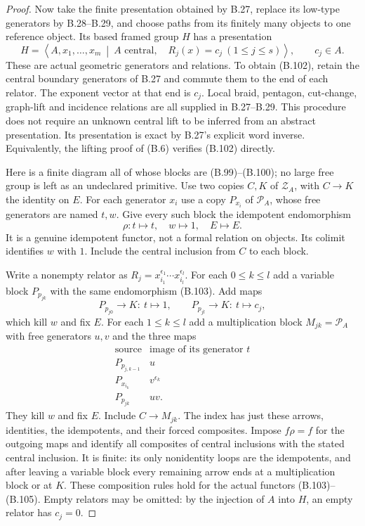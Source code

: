 \begin{proof}
Now take the finite presentation obtained by B.27, replace its
low-type generators by B.28--B.29, and choose paths from its
finitely many objects to one reference object.  Its based
framed group $H$ has a presentation
\[
 H=\left\langle A,x_1,\ldots,x_m\ \middle|\
 A\text{ central},\quad R_j(x)=c_j\ (1\leq j\leq s)
 \right\rangle,
 \qquad c_j\in A.                                             \tag{B.102}
\]
These are actual geometric generators and relations.  To
obtain (B.102), retain the central boundary generators of
B.27 and commute them to the end of each relator.  The
exponent vector at that end is $c_j$.  Local braid,
pentagon, cut-change, graph-lift and incidence relations are
all supplied in B.27--B.29.  This procedure does not require
an unknown central lift to be inferred from an abstract
presentation.  Its presentation is exact by B.27's explicit
word inverse.  Equivalently, the lifting proof of (B.6)
verifies (B.102) directly.

Here is a finite diagram all of whose blocks are
(B.99)--(B.100); no large free group is left as an undeclared
primitive.  Use two copies $C,K$ of $\mathcal Z_A$, with
$C\to K$ the identity on $E$.  For each generator $x_i$
use a copy $P_{x_i}$ of $\mathcal P_A$, whose free generators
are named $t,w$.  Give every such block the idempotent
endomorphism
\[
       \rho:t\mapsto t,\quad w\mapsto1,\quad E\mapsto E.
                                                               \tag{B.103}
\]
It is a genuine idempotent functor, not a formal relation
on objects.  Its colimit identifies $w$ with $1$.
Include the central inclusion from $C$ to each block.

Write a nonempty relator as
$R_j=x_{i_1}^{\epsilon_1}\cdots x_{i_l}^{\epsilon_l}$.
For each $0\leq k\leq l$ add a variable block $P_{p_{jk}}$
with the same endomorphism (B.103).  Add maps
\[
 P_{p_{j0}}\longrightarrow K:\ t\mapsto1,
 \qquad
 P_{p_{jl}}\longrightarrow K:\ t\mapsto c_j,
                                                               \tag{B.104}
\]
which kill $w$ and fix $E$.  For each $1\leq k\leq l$
add a multiplication block $M_{jk}=\mathcal P_A$ with
free generators $u,v$ and the three maps
\[
\begin{array}{c|c}
\text{source}&\text{image of its generator }t\\\hline
P_{p_{j,k-1}}&u\\
P_{x_{i_k}}&v^{\epsilon_k}\\
P_{p_{jk}}&uv.
\end{array}                                                     \tag{B.105}
\]
They kill $w$ and fix $E$.  Include $C\to M_{jk}$.
The index has just these arrows, identities, the idempotents,
and their forced composites.  Impose $f\rho=f$ for the
outgoing maps and identify all composites of central
inclusions with the stated central inclusion.  It is finite:
its only nonidentity loops are the idempotents, and after
leaving a variable block every remaining arrow ends at a
multiplication block or at $K$.  These composition rules
hold for the actual functors (B.103)--(B.105).
Empty relators may be omitted: by the injection of $A$ into
$H$, an empty relator has $c_j=0$.


\end{proof}
